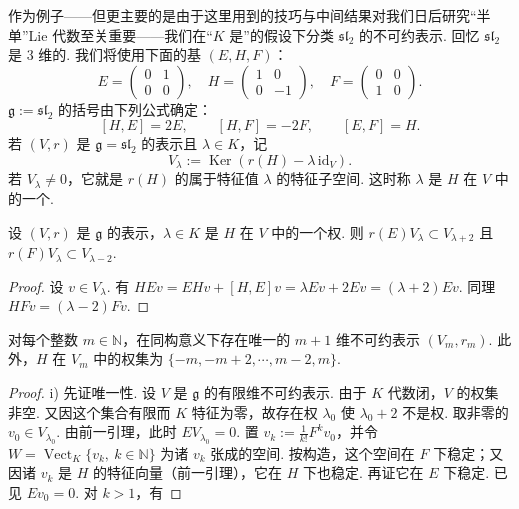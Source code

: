 \begin{numpara}[特征为零时 $\mathfrak{g} = \mathfrak{sl}_2$ 的不可约表示]\label{np:ssl-2-1-10}
作为例子——但更主要的是由于这里用到的技巧与中间结果对我们日后研究``半单''Lie 代数至关重要——我们在``$K$ 是''的假设下分类 $\mathfrak{sl}_2$ 的不可约表示.
回忆 $\mathfrak{sl}_2$ 是 $3$ 维的. 我们将使用下面的基 $(E, H, F)$：
\[E = \begin{pmatrix} 0 & 1 \\ 0 & 0 \end{pmatrix},\quad H = \begin{pmatrix} 1 & 0 \\ 0 & -1 \end{pmatrix},\quad F = \begin{pmatrix} 0 & 0 \\ 1 & 0 \end{pmatrix}.\]
$\mathfrak{g} := \mathfrak{sl}_2$ 的括号由下列公式确定：
\[[H, E] = 2E,\qquad [H, F] = -2F,\qquad [E, F] = H.\]
若 $(V, r)$ 是 $\mathfrak{g} = \mathfrak{sl}_2$ 的表示且 $\lambda \in K$，记
\[V_{\lambda} := \operatorname{Ker}(r(H) - \lambda\, \mathrm{id}_V).\]
若 $V_{\lambda} \neq 0$，它就是 $r(H)$ 的属于特征值 $\lambda$ 的特征子空间. 这时称 $\lambda$ 是 $H$ 在 $V$ 中的一个.
\begin{lemma*}
设 $(V, r)$ 是 $\mathfrak{g}$ 的表示，$\lambda \in K$ 是 $H$ 在 $V$ 中的一个权. 则 $r(E)V_{\lambda} \subset V_{\lambda+2}$ 且 $r(F)V_{\lambda} \subset V_{\lambda-2}$.
\end{lemma*}
\begin{proof}
设 $v \in V_{\lambda}$. 有 $HEv = EHv + [H, E]v = \lambda Ev + 2Ev = (\lambda + 2)Ev$. 同理 $HFv = (\lambda - 2)Fv$.
\end{proof}
\begin{proposition*}
对每个整数 $m \in \mathbb{N}$，在同构意义下存在唯一的 $m + 1$ 维不可约表示 $(V_m, r_m)$. 此外，$H$ 在 $V_m$ 中的权集为 $\{-m, -m + 2, \cdots, m - 2, m\}$.
\end{proposition*}
\begin{proof}
i) 先证唯一性. 设 $V$ 是 $\mathfrak{g}$ 的有限维不可约表示. 由于 $K$ 代数闭，$V$ 的权集非空. 又因这个集合有限而 $K$ 特征为零，故存在权 $\lambda_0$ 使 $\lambda_0 + 2$ 不是权. 取非零的 $v_0 \in V_{\lambda_0}$. 由前一引理，此时 $EV_{\lambda_0} = 0$.
置 $v_k := \tfrac{1}{k!}F^k v_0$，并令 $W = \operatorname{Vect}_K\{v_k,\ k \in \mathbb{N}\}$ 为诸 $v_k$ 张成的空间. 按构造，这个空间在 $F$ 下稳定；又因诸 $v_k$ 是 $H$ 的特征向量（前一引理），它在 $H$ 下也稳定. 再证它在 $E$ 下稳定. 已见 $Ev_0 = 0$. 对 $k > 1$，有

\end{proof}
\end{numpara}
